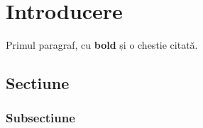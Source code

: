 \chapter{Introducere}

Primul paragraf, cu \textbf{bold} și o chestie citată.\cite{hoare_csp}

\section{Sectiune}
\subsection{Subsectiune}